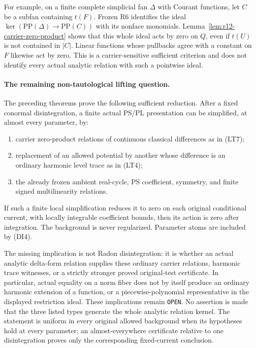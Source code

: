 \documentclass[11pt,a4paper]{article}
\numberwithin{equation}{section}
\theoremstyle{definition}
\theoremstyle{remark}
\begin{document}
For example, on a finite complete simplicial fan $\Delta$ with
Courant functions, let $C$ be a subfan containing $t(F)$. Frozen
R6 identifies the ideal
$\ker(\mathrm{PP}(\Delta)\to\mathrm{PP}(C))$ with its nonface
monomials. Lemma~\ref{lem:r12-carrier-zero-product} shows that this
whole ideal acts by zero on $Q$, even if $t(U)$ is not contained
in $|C|$. Linear functions whose pullbacks agree with a constant
on $F$ likewise act by zero. This is a carrier-sensitive sufficient
criterion and does not identify every actual analytic relation
with such a pointwise ideal.

\paragraph{The remaining non-tautological lifting question.}
The preceding theorems prove the following sufficient reduction.
After a fixed conormal disintegration, a finite actual PS/PL
presentation can be simplified, at almost every parameter, by:
\begin{enumerate}
\item carrier zero-product relations of continuous classical
differences as in (LT7);
\item replacement of an allowed potential by another whose
difference is an ordinary harmonic level trace as in (LT4);
\item the already frozen ambient real-cycle, PS coefficient,
symmetry, and finite signed multilinearity relations.
\end{enumerate}
If such a finite local simplification reduces it to zero on each
original conditional current, with locally integrable coefficient
bounds, then its action is zero after integration. The background
is never regularized. Parameter atoms are included by (DI4).

The missing implication is not Radon disintegration: it is whether
an actual analytic delta-form relation supplies these ordinary
carrier relations, harmonic trace witnesses, or a strictly stronger
proved original-test certificate. In particular, actual equality
on a norm fiber does not by itself produce an ordinary harmonic
extension of a function, or a piecewise-polynomial representative
in the displayed restriction ideal. These implications remain
\texttt{OPEN}. No assertion is made that the three listed types
generate the whole analytic relation kernel. The statement is
uniform in every original allowed background when its hypotheses
hold at every parameter; an almost-everywhere certificate relative
to one disintegration proves only the corresponding fixed-current
conclusion.
\end{document}
